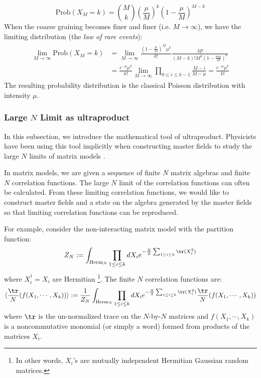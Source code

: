 \documentclass[a4paper,11pt]{article}
\theoremstyle{definition}
\numberwithin{equation}{section}
\begin{document}
\begin{equation*}
    \text{Prob}(X_M = k) = \binom{M}{k}(\frac{\mu}{M})^k(1- \frac{\mu}{M})^{M-k}
\end{equation*}
When the coarse graining becomes finer and finer (i.e. $M\rightarrow \infty$), we have the limiting distribution (the \textit{law of rare events}):
\begin{align}
    \begin{split}
       \lim_{M\rightarrow\infty}\text{Prob}(X_M = k) &= 
        \lim_{M\rightarrow\infty}\frac{(1 - \frac{\mu}{M})^M\mu^k}{k!}\frac{M!}{(M-k)!M^k(1 - \frac{mu}{M})^k} \\&= \frac{e^{-\mu}\mu^k}{k!}\lim_{M\rightarrow\infty}\prod_{0\leq i\leq k-1}\frac{M-i}{M-\mu} = \frac{e^{-\mu}\mu^k}{k!} 
    \end{split}
\end{align}
The resulting probability distribution is the classical Poisson distribution with intensity $\mu$. 
\subsubsection{Large $N$ Limit as ultraproduct}\label{subsubsection:large_N}
In this subsection, we introduce the mathematical tool of ultraproduct. Physicists have been using this tool implicitly when constructing master fields to study the large $N$ limits of matrix models \cite{Gopakumar-Gross}.

In matrix models, we are given a sequence of finite $N$ matrix algebras and finite $N$ correlation functions. The large $N$ limit of the correlation functions can often be calculated. From these limiting correlation functions, we would like to construct master fields and a state on the algebra generated by the master fields so that limiting correlation functions can be reproduced. 

For example, consider the non-interacting matrix model with the partition function:
\begin{equation}
    Z_N := \int_{\text{Herm}_N} \prod_{1\leq i\leq k}dX_i e^{-\frac{N}{2}\sum_{1\leq i\leq k}\tr(X_i^2)}
\end{equation}
where $X_i^\dagger = X_i$ are Hermitian \footnote{In other words, $X_i$'s are mutually independent Hermitian Gaussian random matrices.}. The finite $N$ correlation functions are:
\begin{equation}
    \langle \frac{\tr}{N}(f(X_1,\cdots,X_k))\rangle:=\frac{1}{Z_N}\int_{\text{Herm}_N} \prod_{1\leq i\leq k}dX_i e^{-\frac{N}{2}\sum_{1\leq i\leq k}\tr(X_i^2)}\frac{\tr}{N}(f(X_1,\cdots,X_k))
\end{equation}
where $\tr$ is the un-normalized trace on the $N$-by-$N$ matrices and $f(X_1,\cdots,X_k)$ is a noncommutative monomial (or simply a word) formed from products of the matrices $X_i$.
\end{document}
